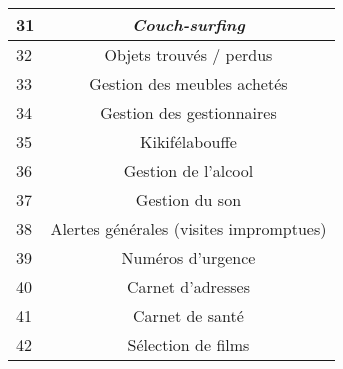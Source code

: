 \documentclass[a4paper, 12pt, french]{article}
\begin{document}
\begin{longtable}{|l|c|}
  	31 & \textit{Couch-surfing} \\ \hline
  	32 & Objets trouvés / perdus \\ \hline
  	33 & Gestion des meubles achetés \\ \hline
  	34 & Gestion des gestionnaires \\ \hline
  	35 & Kikifélabouffe \texttrademark\\ \hline
  	36 & Gestion de l'alcool\\ \hline
  	37 & Gestion du son\\ \hline
  	38 & Alertes générales (visites impromptues)\\ \hline
  	39 & Numéros d'urgence\\ \hline
  	40 & Carnet d'adresses\\ \hline
  	41 & Carnet de santé\\ \hline
  	42 & Sélection de films\\ \hline
	\end{longtable}
\end{document}

